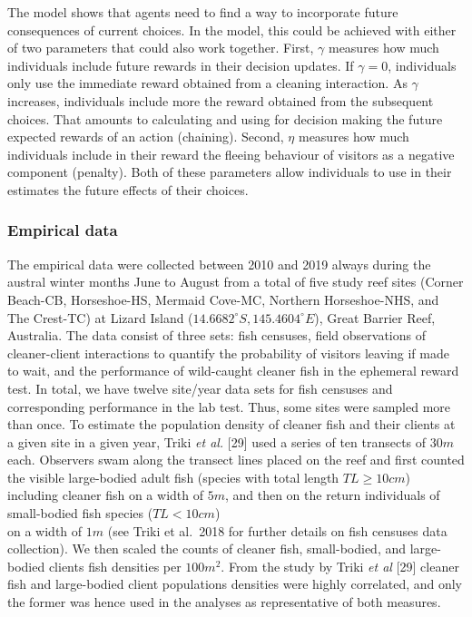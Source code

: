 \documentclass[10pt,letterpaper]{article}
\begin{document}
The model shows that agents need to find a way to incorporate future
consequences of current choices. In the model, this could be achieved
with either of two parameters that could also work together. First,
\(\gamma\) measures how much individuals include future rewards in their
decision updates. If \(\gamma=0\), individuals only use the immediate
reward obtained from a cleaning interaction. As \(\gamma\) increases,
individuals include more the reward obtained from the subsequent
choices. That amounts to calculating and using for decision making the
future expected rewards of an action (chaining). Second, \(\eta\)
measures how much individuals include in their reward the fleeing
behaviour of visitors as a negative component (penalty). Both of these
parameters allow individuals to use in their estimates the future
effects of their choices.

\hypertarget{empirical-data}{%
\subsubsection{Empirical data}\label{empirical-data}}

The empirical data were collected between 2010 and 2019 always during
the austral winter months June to August from a total of five study reef
sites (Corner Beach-CB, Horseshoe-HS, Mermaid Cove-MC, Northern
Horseshoe-NHS, and The Crest-TC) at Lizard Island
(\(14.6682^\circ S, 145.4604^\circ E\)), Great Barrier Reef, Australia.
The data consist of three sets: fish censuses, field observations of
cleaner-client interactions to quantify the probability of visitors
leaving if made to wait, and the performance of wild-caught cleaner fish
in the ephemeral reward test. In total, we have twelve site/year data
sets for fish censuses and corresponding performance in the lab test.
Thus, some sites were sampled more than once. To estimate the population
density of cleaner fish and their clients at a given site in a given
year, Triki \emph{et al.} {[}29{]} used a series of ten transects of
\(30m\) each. Observers swam along the transect lines placed on the reef
and first counted the visible large-bodied adult fish (species with
total length \(TL \geq 10cm\)) including cleaner fish on a width of
\(5m\), and then on the return individuals of small-bodied fish species
(\(TL < 10 cm\))\\
on a width of \(1 m\) (see Triki et al.~2018 for further details on fish
censuses data collection). We then scaled the counts of cleaner fish,
small-bodied, and large-bodied clients fish densities per \(100 m^2\).
From the study by Triki \emph{et al} {[}29{]} cleaner fish and
large-bodied client populations densities were highly correlated, and
only the former was hence used in the analyses as representative of both
measures.
\end{document}
